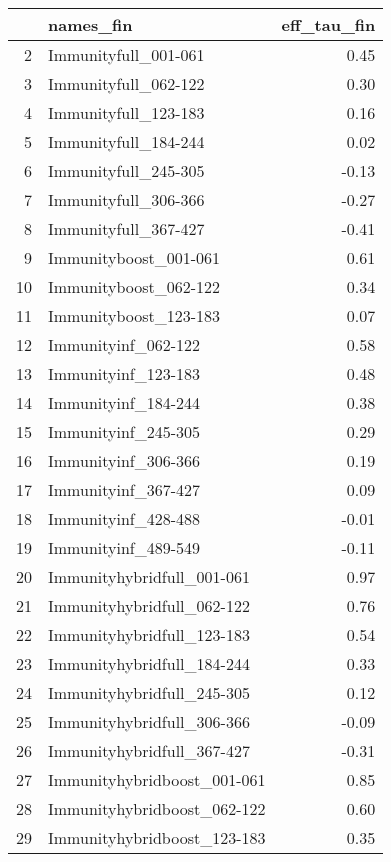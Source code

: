\begin{table}[ht]
\centering
\begin{tabular}{rlr}
  \hline
 & names\_fin & eff\_tau\_fin \\ 
  \hline
2 & Immunityfull\_001-061 & 0.45 \\ 
  3 & Immunityfull\_062-122 & 0.30 \\ 
  4 & Immunityfull\_123-183 & 0.16 \\ 
  5 & Immunityfull\_184-244 & 0.02 \\ 
  6 & Immunityfull\_245-305 & -0.13 \\ 
  7 & Immunityfull\_306-366 & -0.27 \\ 
  8 & Immunityfull\_367-427 & -0.41 \\ 
  9 & Immunityboost\_001-061 & 0.61 \\ 
  10 & Immunityboost\_062-122 & 0.34 \\ 
  11 & Immunityboost\_123-183 & 0.07 \\ 
  12 & Immunityinf\_062-122 & 0.58 \\ 
  13 & Immunityinf\_123-183 & 0.48 \\ 
  14 & Immunityinf\_184-244 & 0.38 \\ 
  15 & Immunityinf\_245-305 & 0.29 \\ 
  16 & Immunityinf\_306-366 & 0.19 \\ 
  17 & Immunityinf\_367-427 & 0.09 \\ 
  18 & Immunityinf\_428-488 & -0.01 \\ 
  19 & Immunityinf\_489-549 & -0.11 \\ 
  20 & Immunityhybridfull\_001-061 & 0.97 \\ 
  21 & Immunityhybridfull\_062-122 & 0.76 \\ 
  22 & Immunityhybridfull\_123-183 & 0.54 \\ 
  23 & Immunityhybridfull\_184-244 & 0.33 \\ 
  24 & Immunityhybridfull\_245-305 & 0.12 \\ 
  25 & Immunityhybridfull\_306-366 & -0.09 \\ 
  26 & Immunityhybridfull\_367-427 & -0.31 \\ 
  27 & Immunityhybridboost\_001-061 & 0.85 \\ 
  28 & Immunityhybridboost\_062-122 & 0.60 \\ 
  29 & Immunityhybridboost\_123-183 & 0.35 \\ 
   \hline
\end{tabular}
\end{table}
